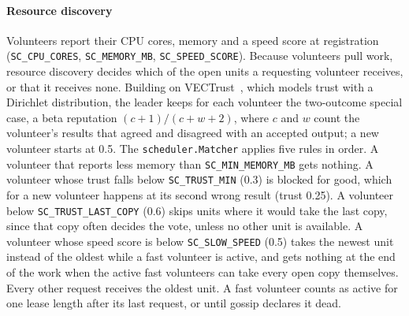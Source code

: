 \paragraph{Resource discovery} Volunteers report their CPU cores, memory and a speed score at registration (\texttt{SC\_CPU\_CORES}, \texttt{SC\_MEMORY\_MB}, \texttt{SC\_SPEED\_SCORE}). Because volunteers pull work, resource discovery decides which of the open units a requesting volunteer receives, or that it receives none. Building on VECTrust~\cite{pandey2021vectrust}, which models trust with a Dirichlet distribution, the leader keeps for each volunteer the two-outcome special case, a beta reputation $(c+1)/(c+w+2)$, where $c$ and $w$ count the volunteer's results that agreed and disagreed with an accepted output; a new volunteer starts at 0.5. The \texttt{scheduler.Matcher} applies five rules in order. A volunteer that reports less memory than \texttt{SC\_MIN\_MEMORY\_MB} gets nothing. A volunteer whose trust falls below \texttt{SC\_TRUST\_MIN} (0.3) is blocked for good, which for a new volunteer happens at its second wrong result (trust 0.25). A volunteer below \texttt{SC\_TRUST\_LAST\_COPY} (0.6) skips units where it would take the last copy, since that copy often decides the vote, unless no other unit is available. A volunteer whose speed score is below \texttt{SC\_SLOW\_SPEED} (0.5) takes the newest unit instead of the oldest while a fast volunteer is active, and gets nothing at the end of the work when the active fast volunteers can take every open copy themselves. Every other request receives the oldest unit. A fast volunteer counts as active for one lease length after its last request, or until gossip declares it dead.

